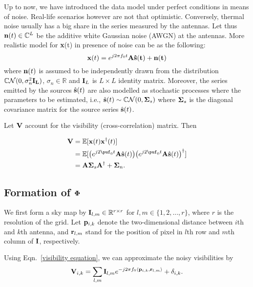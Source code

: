 \documentclass[article]{imsart}
\begin{document}
 Up to now, we have introduced the data model under perfect conditions in means of noise. Real-life scenarios however are not that optimistic. Conversely, thermal noise usually has a big share in the series measured by the antennas. Let thus ${\bf n}(t) \in \mathbb{C}^L$ be the additive white Gaussian noise (AWGN) at the antennas. More realistic model for {\bf x}(t) in presence of noise can be as the following:
 \begin{equation}
 {\bf x}(t) = e^{j2\pi f_0 t}\bf{A} \hat{\bf{s}}(t) + {\bf n}(t)\label{x_t}
 \end{equation}
where ${\bf n}(t)$ is assumed to be independently drawn from the distribution $\mathbb{C} \mathcal{N}(0,\sigma_n^2 \bf{I}_L)$, $\sigma_n \in \mathbb{R}$ and ${\bf I}_L$ is $L\times L$ identity matrix. Moreover, the series emitted by the sources $\hat{{\bf s}}(t)$ are also modelled as stochastic processes where the parameters to be estimated, i.e., $\hat{{\bf s}}(t) \sim \mathbb{C}\mathcal{N}(0, {\bf \Sigma}_s)$ where ${\bf \Sigma}_s$ is the diagonal covariance matrix for the source series $\hat{{\bf s}}(t)$. 

Let ${\bf V}$ account for the visibility (cross-correlation) matrix. Then

\begin{equation}
\begin{split}
{\bf V} & = \mathbb{E}[{\bf x}(t){\bf x}^{\dagger}(t)]\\
& = \mathbb{E}[\big(e^{j2\puf_0t}{\bf A}\hat{\bf s}(t)\big)\big(e^{j2\puf_0t}{\bf A}\hat{\bf s}(t)\big)^{\dagger}]\\
& ={\bf A}{\bf \Sigma}_s{\bf A}^{\dagger} + {\bf \Sigma}_n.
    \end{split}
\end{equation}

\subsection{Formation of ${\bf \Phi}$}
We first form a sky map by ${\bf I}_{l, m} \in \mathbb{R}^{r\times r}$ for $l, m \in \{1, 2, ..., r \}$, where $r$ is the resolution of the grid. Let ${\bf p}_{i, k}$ denote the two-dimensional distance between $i$th and $k$th antenna, and ${\bf r}_{l, m}$ stand for the position of pixel in $l$th row and $m$th column of ${\bf I}$, respectively. 

Using Eqn.~\ref{visibility equation}, we can approximate the noisy visibilities by
\begin{equation}\label{measurement_equation}
    {\bf V}_{i, k} = \sum_{l, m} {\bf I}_{l, m} e^{-j2\pi f_0 \langle{\bf p}_{i, k}, {\bf r}_{l, m}\rangle} + \delta_{i, k}.
\end{equation}
\end{document}
